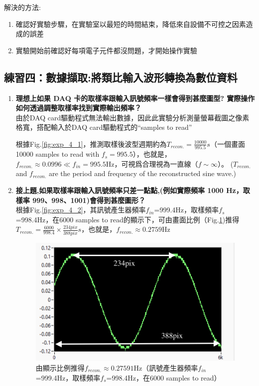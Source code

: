 \documentclass[12pt,a4paper]{article}
\begin{document}
\begin{CJK}{UTF8}{bkai}
解決的方法:
\begin{enumerate}
    \item 確認好實驗步驟，在實驗室以最短的時間結束，降低來自設備不可控之因素造成的誤差
    \item 實驗開始前確認好每項電子元件都沒問題，才開始操作實驗
\end{enumerate}

\subsection{練習四：數據擷取:將類比輸入波形轉換為數位資料}


\begin{enumerate}
\item \textbf{理想上如果 DAQ 卡的取樣率跟輸入訊號頻率一樣會得到甚麼圖型? 實際操作如何透過調整取樣率找到實際輸出頻率？}\\
由於DAQ card驅動程式無法輸出數據，因此此實驗分析測量螢幕截圖之像素格寬，搭配輸入於DAQ card驅動程式的“samples to read”

根據Fig.\ref{fig:exp_4_1}，推測取樣後波型週期約為$T_{recon.}=\frac{10000}{995.5}s$（一個畫面10000 samples to read with $f_{s}=995.5$），也就是，$f_{recon.}\approx0.0996 \ll f_{in}=995.5$Hz，可視爲合理視為一直線（$f\sim\infty$）。 ($T_{recon.}$ and $f_{recon.}$ are the period and frequency of the reconstructed sine wave.)


\item \textbf{接上題,如果取樣率跟輸入訊號頻率只差一點點,(例如實際頻率 1000 Hz，取樣率 999、998、1001)會得到甚麼圖形？}\\
根據Fig.\ref{fig:exp_4_2}，其訊號產生器頻率$f_{in}$=999.4Hz，取樣頻率$f_{s}$=998.4Hz，在6000 samples to read的顯示下，可由畫面比例（Fig.\ref{fig:exp_4_2_crop})推得 $T_{recon.}=\frac{6000}{998.4}\times\frac{234pix}{388pix}s$，也就是，$f_{recon.}\approx0.2759$Hz
\begin{figure}[h]
    \centering
    \includegraphics[width=0.6\linewidth]{figures/exp_4_2.png}
    \caption{由顯示比例推得$f_{recon.}\approx0.27591$Hz（訊號產生器頻率$f_{in}$=999.4Hz，取樣頻率$f_{s}$=998.4Hz，在6000 samples to read）}
    \label{fig:exp_4_2_crop}
\end{figure}


\end{enumerate}
\end{CJK}
\end{document}
